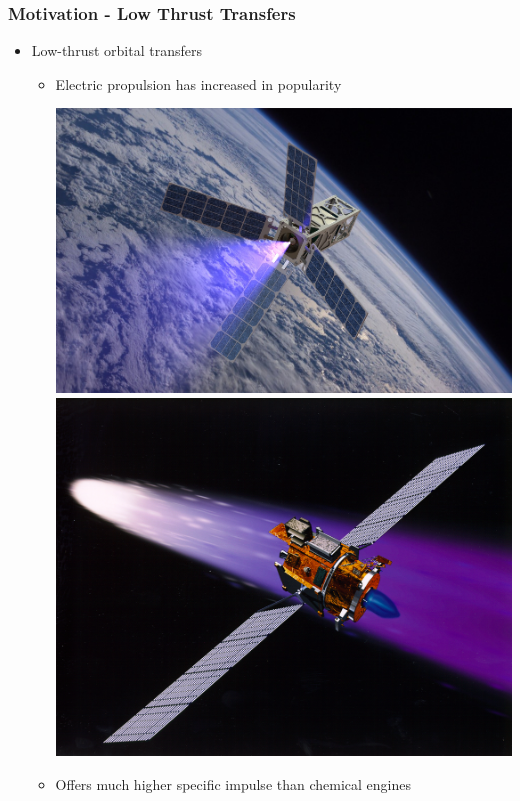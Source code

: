 \begin{frame} %
\frametitle{Motivation - Low Thrust Transfers} %
\begin{itemize}
    \item Low-thrust orbital transfers
    \begin{itemize}
        \item Electric propulsion has increased in popularity

        \includegraphics[height=0.3\textheight]{figures/2016AAS/patriot_plume.jpg}
        \hfill
        \includegraphics[height=0.3\textheight]{figures/2016AAS/deepspace1.jpg}
 
        \item Offers much higher specific impulse than chemical engines 
        

\end{itemize}
\end{itemize}
\end{frame}
